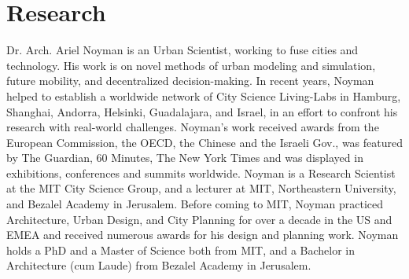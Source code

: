 \section*{Research}

 {
Dr. Arch. Ariel Noyman is an Urban Scientist, working to fuse cities and technology. His work is on novel methods of urban modeling and simulation, future mobility, and decentralized decision-making. In recent years, Noyman helped to establish a worldwide network of City Science Living-Labs in Hamburg, Shanghai, Andorra, Helsinki, Guadalajara, and Israel, in an effort to confront his research with real-world challenges. Noyman's work received awards from the European Commission, the OECD, the Chinese and the Israeli Gov., was featured by The Guardian, 60 Minutes, The New York Times and was displayed in exhibitions, conferences and summits worldwide. Noyman is a Research Scientist at the MIT City Science Group, and a lecturer at MIT, Northeastern University, and Bezalel Academy in Jerusalem. Before coming to MIT, Noyman practiced Architecture, Urban Design, and City Planning for over a decade in the US and EMEA and received numerous awards for his design and planning work. Noyman holds a PhD and a Master of Science both from MIT, and a Bachelor in Architecture (cum Laude) from Bezalel Academy in Jerusalem.
 }

